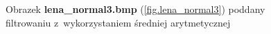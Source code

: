 \documentclass{classrep}
\begin{document}
\begin{figure}
{{  \label{fig.lena_normal3_average_5x5}
 }
}
\caption{Obrazek \textbf{lena\_normal3.bmp} (\ref{fig.lena_normal3}) poddany filtrowaniu z~wykorzystaniem średniej arytmetycznej}
\label{fig.lena_normal3_average}
\end{figure}
\end{document}
